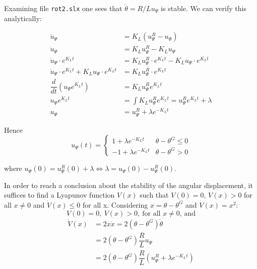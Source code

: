 Examining file \texttt{rot2.slx} one sees that $\dot{\theta} = R/L u_{\Psi}$ is
stable. We can verify this analytically:

\begin{align*}
  \dot{u}_{\Psi} &= K_L (u_{\Psi}^R - u_{\Psi})  \\
  \dot{u}_{\Psi} &= K_L u_{\Psi}^R - K_L u_{\Psi}  \\
  \dot{u}_{\Psi} \cdot e^{K_L t} &= K_L u_{\Psi}^R \cdot e^{K_L t} - K_L u_{\Psi} \cdot e^{K_L t}  \\
  \dot{u}_{\Psi} \cdot e^{K_L t} + K_L u_{\Psi} \cdot e^{K_L t} &= K_L u_{\Psi}^R \cdot e^{K_L t} \\
  \dfrac{d}{dt}(u_{\Psi} e^{K_L t}) &= K_L u_{\Psi}^R e^{K_L t} \\
  u_{\Psi} e^{K_L t} &= \int K_L u_{\Psi}^R e^{K_L t} = u_{\Psi}^R e^{K_L t} + \lambda \\
  u_{\Psi} &= u_{\Psi}^R + \lambda e^{-K_L t}
\end{align*}

Hence
\begin{equation}
  u_{\Psi}(t) = \left\{
    \begin{matrix}
    1 + \lambda e^{-K_L t} & \theta - \theta^G \leq 0 \\
    -1 + \lambda e^{-K_L t} & \theta - \theta^G > 0
    \end{matrix}\right.
\end{equation}

where $u_{\Psi}(0) = u_{\Psi}^R(0) + \lambda \Leftrightarrow \lambda = u_{\Psi}(0) - u_{\Psi}^R(0)$.

In order to reach a conclusion about the stability of the angular displacement,
it suffices to find a Lyapunov function $V(x)$ such that $V(0) = 0$, $V(x) > 0$
for all $x \neq 0$ and $\dot{V}(x) \leq 0$ for all x. Considering
$x = \theta - \theta^G$ and $V(x) = x^2$:
$$V(0) = 0,\ V(x) > 0,\ \text{for all } x \neq 0\text{, and}$$
\begin{align*}
  \dot{V}(x) &= 2 x \dot{x} = 2 (\theta - \theta^G) \dot{\theta}  \\
             &= 2 (\theta - \theta^G) \dfrac{R}{L} u_{\Psi} \\
             &= 2 (\theta - \theta^G) \dfrac{R}{L} (u_{\Psi}^R + \lambda e^{-K_L t})
\end{align*}

